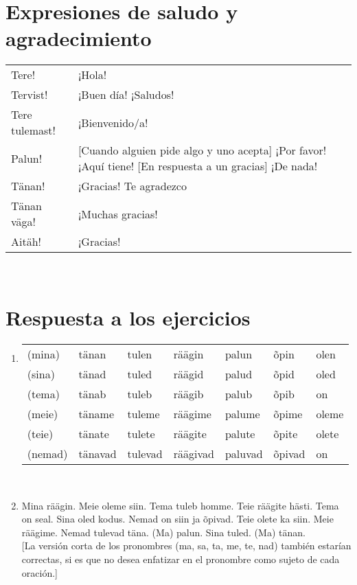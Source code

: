 \section*{\Large{Expresiones de saludo y agradecimiento}}

\begin{tabular}{ l p{8cm} }
	Tere!					& ¡Hola! \\
	Tervist!				& ¡Buen día! ¡Saludos! \\
	Tere tulemast! 			& ¡Bienvenido/a! \\
	Palun!					& \small{[Cuando alguien pide algo y uno acepta]} ¡Por favor! ¡Aquí tiene! \small{[En respuesta a un gracias]} ¡De nada! \\
	Tänan!					& ¡Gracias! Te agradezco \\
	Tänan väga! 			& ¡Muchas gracias! \\
	Aitäh!					& ¡Gracias!
\end{tabular}\\ \bigskip

\section*{\Large{Respuesta a los ejercicios}}

\begin{enumerate}
\item 
\begin{tabular}{ l l l l l l l }
	(mina)	& tänan		& tulen		& räägin	& palun		& õpin		& olen \\
	(sina)	& tänad		& tuled		& räägid	& palud		& õpid		& oled \\
	(tema)	& tänab		& tuleb		& räägib	& palub		& õpib		& on \\
	(meie)	& täname	& tuleme	& räägime	& palume	& õpime		& oleme \\
	(teie)	& tänate	& tulete	& räägite	& palute	& õpite		& olete \\
	(nemad)	& tänavad	& tulevad	& räägivad	& paluvad	& õpivad	& on 
\end{tabular}\\ \bigskip
\item Mina räägin. Meie oleme siin. Tema tuleb homme. Teie räägite hästi. Tema on seal. Sina oled kodus. Nemad on siin ja õpivad. Teie olete ka siin. Meie räägime. Nemad tulevad täna. (Ma) palun. Sina tuled. (Ma) tänan.\\

[La versión corta de los pronombres (ma, sa, ta, me, te, nad) también estarían correctas, si es que no desea enfatizar en el pronombre como sujeto de cada oración.]
\end{enumerate}

